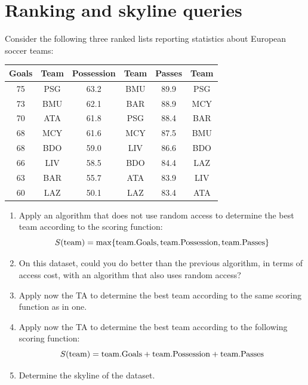 \documentclass[12pt, a4paper]{report}
\newtheorem[style=M,bodystyle=\normalfont]{theorem}{Theorem}
\newtheorem[style=M,bodystyle=\normalfont]{corollary}{Corollary}
\newtheorem[style=M,bodystyle=\normalfont]{lemma}{Lemma}
\newtheorem[style=M,bodystyle=\normalfont]{definition}{Definition}
\begin{document}
    \section{Ranking and skyline queries}
        Consider the following three ranked lists reporting statistics about European soccer teams: 
        \begin{table}[H]
            \centering
            \begin{tabular}{|cc|cc|cc|}
            \hline
            \textbf{Goals} & \textbf{Team} & \textbf{Possession} & \textbf{Team} & \textbf{Passes} & \textbf{Team} \\ \hline
            75         & PSG      & 63.2         & BMU      & 89.9         & PSG      \\
            73         & BMU      & 62.1         & BAR      & 88.9         & MCY      \\
            70         & ATA      & 61.8         & PSG      & 88.4         & BAR      \\
            68         & MCY      & 61.6         & MCY      & 87.5         & BMU      \\
            68         & BDO      & 59.0         & LIV      & 86.6         & BDO      \\
            66         & LIV      & 58.5         & BDO      & 84.4         & LAZ      \\
            63         & BAR      & 55.7         & ATA      & 83.9         & LIV      \\
            60         & LAZ      & 50.1         & LAZ      & 83.4         & ATA      \\ \hline
            \end{tabular}
        \end{table}
        \begin{enumerate}
            \item Apply an algorithm that does not use random access to determine the best team according to the scoring function:
                \[S(\textnormal{team})=\max\{\textnormal{team.Goals},\textnormal{team.Possession},\textnormal{team.Passes}\}\]
            \item On this dataset, could you do better than the previous algorithm, in terms of access cost, with an algorithm that also uses random access? 
            \item Apply now the TA to determine the best team according to the same scoring function as in one. 
            \item Apply now the TA to determine the best team according to the following scoring function:
                \[S(\textnormal{team}) = \textnormal{team.Goals} + \textnormal{team.Possession} + \textnormal{team.Passes}\]
            \item Determine the skyline of the dataset. 
        \end{enumerate}
\end{document}
